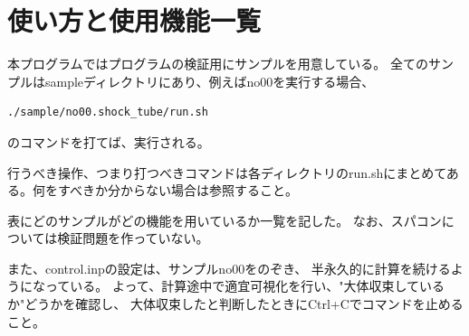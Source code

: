 \documentclass{jsarticle}
\begin{document}
\section{使い方と使用機能一覧}%
本プログラムではプログラムの検証用にサンプルを用意している。
全てのサンプルはsampleディレクトリにあり、例えばno00を実行する場合、
\begin{verbatim}
./sample/no00.shock_tube/run.sh
\end{verbatim}
のコマンドを打てば、実行される。

行うべき操作、つまり打つべきコマンドは各ディレクトリのrun.shにまとめてある。何をすべきか分からない場合は参照すること。

表にどのサンプルがどの機能を用いているか一覧を記した。
なお、スパコンについては検証問題を作っていない。

また、control.inpの設定は、サンプルno00をのぞき、
半永久的に計算を続けるようになっている。
よって、計算途中で適宜可視化を行い、"大体収束しているか"どうかを確認し、
大体収束したと判断したときにCtrl+Cでコマンドを止めること。
\end{document}
